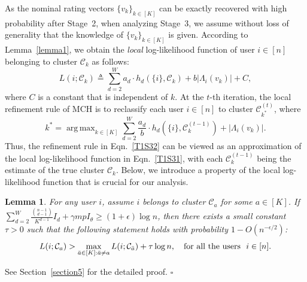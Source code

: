 \documentclass{article}
\DeclareMathOperator*{\argmax}{arg\,max}
\newtheorem{lemma}{Lemma}
\newenvironment{proof}{{\noindent\it Proof:}\quad}{\hfill $\square$\par}
\begin{document}
As the nominal rating vectors $\{ v_k \}_{k \in [K]}$ can be exactly recovered with high probability after Stage~2, when analyzing Stage~3, we assume without loss of generality that the knowledge of $\{ v_k \}_{k \in [K]}$ is given.
According to Lemma~\ref{lemma1}, we obtain the \emph{local} log-likelihood function of user $i \in [n]$ belonging to cluster $\mathcal{C}_k$ as follows:
\begin{equation}\label{T1S31}
    L(i; \mathcal{C}_k) \triangleq \sum_{d=2}^{W} a_d \cdot h_d(\{i\}, \mathcal{C}_k) + b |\Lambda_i(v_k)| + C,
\end{equation}
where $C$ is a constant that is independent of $k$.
At the $t$-th iteration, the local refinement rule of MCH is to reclassify each user $i \in [n]$ to cluster $\mathcal{C}_{k^*}^{(t)}$, where 
\begin{equation}\label{T1S32}
    k^* =  \argmax_{k \in [K]}	  \sum_{d=2}^{W} \frac{a_d}{b} \cdot h_d (\{i\}, \mathcal{C}_k^{(t-1)})  + |\Lambda_{i}(v_k)|.
\end{equation}
Thus, the refinement rule in Eqn.~\eqref{T1S32} can be viewed as an approximation of the local log-likelihood function in Eqn.~\eqref{T1S31}, with each $\mathcal{C}^{(t-1)}_k$ being the estimate of the true cluster $\mathcal{C}_k$. Below, we introduce a property of the  local log-likelihood function that is crucial for our analysis. 
\begin{lemma}\label{lemma5}
    For any user $i$, assume $i$ belongs to cluster $\mathcal{C}_a$ for some $a \in [K]$. If $\sum_{d=2}^W \frac{\binom{n-1}{d-1}}{K^{d-1}} I_d + \gamma m p I_{\theta} \geq (1+\epsilon) \log n$, then there exists a small constant $\tau > 0$ such that the following statement holds with probability $1-O(n^{-\epsilon / 2})$:
    \begin{equation}\label{T1S33}
            L(i; \mathcal{C}_a) > \max_{\Bar{a} \in [K]: \Bar{a} \neq a} L(i; \mathcal{C}_{\Bar{a}}) + \tau \log n, \quad  \text{for all the users \ } i \in [n]. 
    \end{equation}
\end{lemma}

\begin{proof}
    See Section~\ref{section5} for the detailed proof.
\end{proof}
\end{document}

